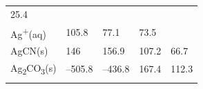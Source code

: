 \documentclass[
  9pt,
]{extbook}
\theoremstyle{definition}
\theoremstyle{definition}
\theoremstyle{definition}
\theoremstyle{remark}
\begin{document}
\begin{longtable}[]{@{}lllll@{}}
\begin{minipage}[t]{0.18\columnwidth}
25.4\strut
\end{minipage}\tabularnewline
\begin{minipage}[t]{0.10\columnwidth}\raggedright
Ag\textsuperscript{+}(aq)\strut
\end{minipage} & \begin{minipage}[t]{0.19\columnwidth}\raggedright
105.8\strut
\end{minipage} & \begin{minipage}[t]{0.20\columnwidth}\raggedright
77.1\strut
\end{minipage} & \begin{minipage}[t]{0.18\columnwidth}\raggedright
73.5\strut
\end{minipage} & \begin{minipage}[t]{0.18\columnwidth}\raggedright
\strut
\end{minipage}\tabularnewline
\begin{minipage}[t]{0.10\columnwidth}\raggedright
AgCN(s)\strut
\end{minipage} & \begin{minipage}[t]{0.19\columnwidth}\raggedright
146\strut
\end{minipage} & \begin{minipage}[t]{0.20\columnwidth}\raggedright
156.9\strut
\end{minipage} & \begin{minipage}[t]{0.18\columnwidth}\raggedright
107.2\strut
\end{minipage} & \begin{minipage}[t]{0.18\columnwidth}\raggedright
66.7\strut
\end{minipage}\tabularnewline
\begin{minipage}[t]{0.10\columnwidth}\raggedright
Ag\textsubscript{2}CO\textsubscript{3}(s)\strut
\end{minipage} & \begin{minipage}[t]{0.19\columnwidth}\raggedright
--505.8\strut
\end{minipage} & \begin{minipage}[t]{0.20\columnwidth}\raggedright
--436.8\strut
\end{minipage} & \begin{minipage}[t]{0.18\columnwidth}\raggedright
167.4\strut
\end{minipage} & \begin{minipage}[t]{0.18\columnwidth}\raggedright
112.3\strut
\end{minipage}\tabularnewline
\begin{minipage}[t]{0.10\columnwidth}\raggedright

\end{minipage}
\end{longtable}
\end{document}
